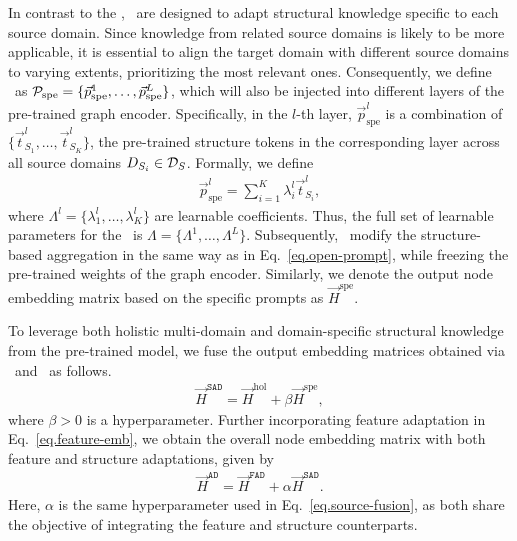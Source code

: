 In contrast to the \op, \cp\ are designed to adapt structural knowledge specific to each source domain. Since knowledge from related source domains is likely to be more applicable, it is essential to align the target domain with different source domains to varying extents, prioritizing the most relevant ones. Consequently, we define \cp\ as \( \mathcal{P}_\text{spe} = \{ \Vec{p}^1_\text{spe}, \ldots, \Vec{p}^L_\text{spe} \} \), which will also be injected into different layers of the pre-trained graph encoder. Specifically, in the $l$-th layer, \( \Vec{p}^l_\text{spe} \) is a combination of \( \{ \vec{t}^l_{S_1},\ldots,\vec{t}^l_{S_K}\} \), the pre-trained structure tokens in the corresponding layer 
 across all source domains $D_{S_i} \in \mathcal{D}_{S}$.
Formally, we define
\begin{align}\label{eq.specific-prompt-generation}\textstyle
\Vec{p}^l_\text{spe} = \sum_{i=1}^K \lambda^l_i \Vec{t}^l_{S_i},
\end{align}
where \( \Lambda^l = \{ \lambda^l_1, \ldots, \lambda^l_K \} \) are learnable coefficients. Thus, the full set of learnable parameters for the \cp\ is \( \Lambda = \{ \Lambda^1, \ldots, \Lambda^L \} \). Subsequently, \cp\ modify the structure-based aggregation in the same way as in Eq.~\eqref{eq.open-prompt}, while freezing the pre-trained weights of the graph encoder. Similarly, we denote the output node embedding matrix based on the specific prompts as \( \vec{H}^\text{spe} \).

To leverage both holistic multi-domain and domain-specific structural knowledge from the pre-trained model, we fuse the output embedding matrices obtained via \op\ and \cp\ as follows.
\begin{align}\label{eq.structure-emb}
    \vec{H}^\mathtt{SAD} =\vec{H}^\text{hol}+\beta\vec{H}^\text{spe},
\end{align}
where $\beta>0$ is a hyperparameter. 
Further incorporating feature adaptation in Eq.~\eqref{eq.feature-emb}, 
we obtain the overall node embedding matrix with both feature and structure adaptations, given by
\begin{align}\label{eq.down-fusion}
    \vec{H}^\mathtt{AD} =\vec{H}^\mathtt{FAD}+\alpha\vec{H}^\mathtt{SAD}.
\end{align}
Here, $\alpha$ is the same hyperparameter used in Eq.~\eqref{eq.source-fusion}, as both share the objective of integrating the feature and structure counterparts.

